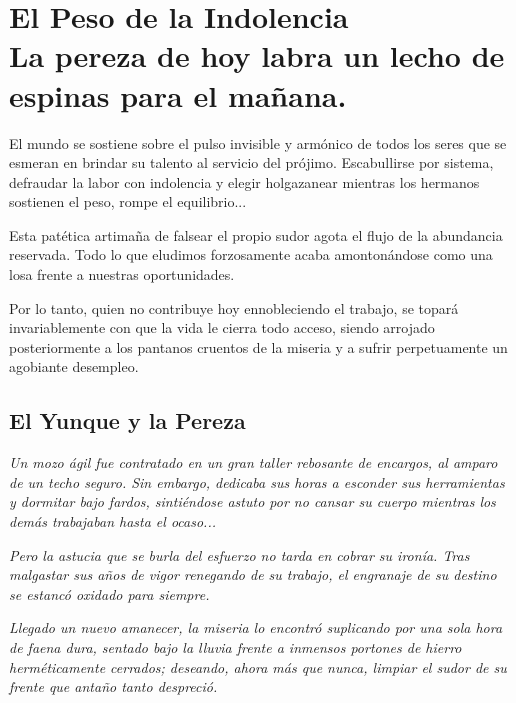 \chapter[El Peso de la Indolencia]{El Peso de la Indolencia\\ \large La pereza de hoy labra un lecho de espinas para el mañana.}


\lettrine[lines=3, nindent=0.5em, findent=0.2em]{E}{}l mundo se sostiene sobre el pulso invisible y armónico de todos los seres que se esmeran en brindar su talento al servicio del prójimo. Escabullirse por sistema, defraudar la labor con indolencia y elegir holgazanear mientras los hermanos sostienen el peso, rompe el equilibrio...

Esta patética artimaña de falsear el propio sudor agota el flujo de la abundancia reservada. Todo lo que eludimos forzosamente acaba amontonándose como una losa frente a nuestras oportunidades.

Por lo tanto, quien no contribuye hoy ennobleciendo el trabajo, se topará invariablemente con que la vida le cierra todo acceso, siendo arrojado posteriormente a los pantanos cruentos de la miseria y a sufrir perpetuamente un agobiante desempleo.

\section{El Yunque y la Pereza}
\begin{elegantquote}
\textit{Un mozo ágil fue contratado en un gran taller rebosante de encargos, al amparo de un techo seguro. Sin embargo, dedicaba sus horas a esconder sus herramientas y dormitar bajo fardos, sintiéndose astuto por no cansar su cuerpo mientras los demás trabajaban hasta el ocaso...}

\textit{Pero la astucia que se burla del esfuerzo no tarda en cobrar su ironía. Tras malgastar sus años de vigor renegando de su trabajo, el engranaje de su destino se estancó oxidado para siempre.}

\textit{Llegado un nuevo amanecer, la miseria lo encontró suplicando por una sola hora de faena dura, sentado bajo la lluvia frente a inmensos portones de hierro herméticamente cerrados; deseando, ahora más que nunca, limpiar el sudor de su frente que antaño tanto despreció.}

\end{elegantquote}


